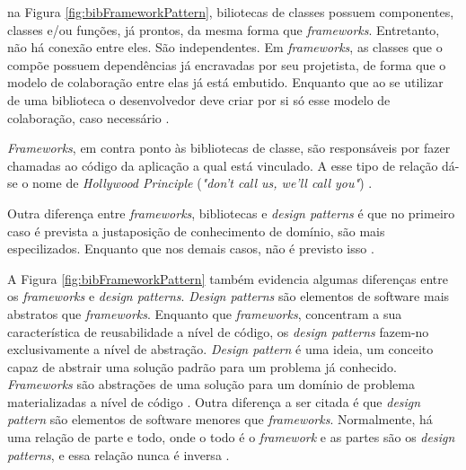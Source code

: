 na Figura \ref{fig:bibFrameworkPattern}, biliotecas de classes possuem
componentes, classes e/ou funções, já prontos, da mesma forma que
\textit{frameworks}. Entretanto, não há conexão entre eles. São independentes.
Em \textit{frameworks}, as classes que o compõe possuem dependências já
encravadas por seu projetista, de forma que o modelo de colaboração entre elas
já está embutido. Enquanto que ao se utilizar de uma biblioteca o desenvolvedor
deve criar por si só esse modelo de colaboração, caso necessário
\cite{barretoJunior2006}.
\par
\indent \textit{Frameworks}, em contra ponto às bibliotecas de classe, são
responsáveis por fazer chamadas ao código da aplicação a qual está vinculado.
A esse tipo de relação dá-se o nome de \textit{Hollywood Principle}
(\textit{"don't call us, we'll call you"}) \cite{sauve2006}.
\par
\indent Outra diferença entre \textit{frameworks}, bibliotecas e
\textit{design patterns} é que no  primeiro caso é prevista a justaposição de
conhecimento de domínio, são mais especilizados. Enquanto que nos demais casos,
não é previsto isso \cite{sauve2006}.
\par
\indent A Figura  \ref{fig:bibFrameworkPattern} também evidencia algumas
diferenças entre os \textit{frameworks} e \textit{design patterns}.
\textit{Design patterns} são elementos de software mais abstratos que
\textit{frameworks}. Enquanto que \textit{frameworks}, concentram a sua
característica de reusabilidade a nível de código, os \textit{design patterns}
fazem-no exclusivamente a nível de abstração. \textit{Design pattern} é uma
ideia, um conceito capaz de abstrair uma solução padrão para um problema já
conhecido. \textit{Frameworks} são abstrações de uma solução para um domínio de
problema materializadas a nível de código \cite{sauve2006}. Outra diferença a
ser citada é que \textit{design pattern} são elementos de software menores que
\textit{frameworks}. Normalmente, há uma relação de parte e todo, onde o todo é
o \textit{framework} e as partes são os \textit{design patterns}, e essa
relação nunca é inversa \cite{sauve2006}.

